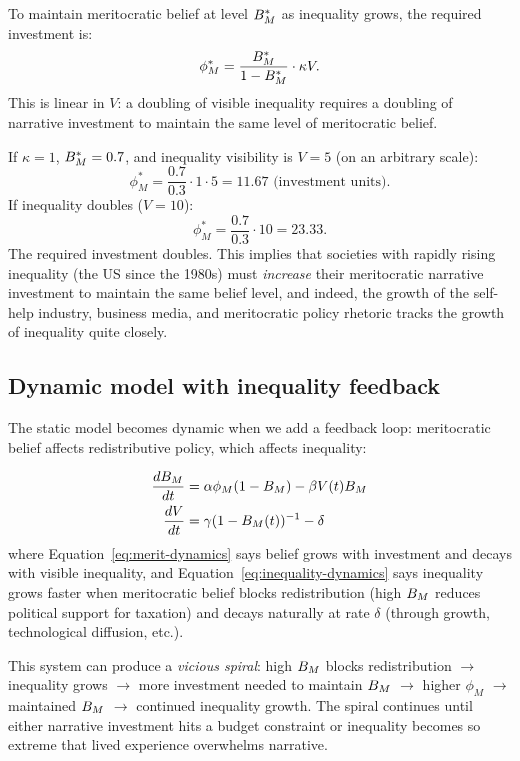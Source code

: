 \begin{proposition}
\label{prop:legitimation-cost}
To maintain meritocratic belief at level $B_{M}^*$ as inequality grows, the required investment is:
\[
  \phi_M^* = \frac{B_{M}^*}{1 - B_{M}^*} \cdot \kappa V.
\]
This is linear in $V$: a doubling of visible inequality requires a doubling of narrative investment to maintain the same level of meritocratic belief.
\end{proposition}

\begin{example}
\label{ex:legitimation-cost}
If $\kappa = 1$, $B_{M}^* = 0.7$, and inequality visibility is $V = 5$ (on an arbitrary scale):
\[
  \phi_M^* = \frac{0.7}{0.3} \cdot 1 \cdot 5 = 11.67 \text{ (investment units)}.
\]
If inequality doubles ($V = 10$):
\[
  \phi_M^* = \frac{0.7}{0.3} \cdot 10 = 23.33.
\]
The required investment doubles.
This implies that societies with rapidly rising inequality (the US since the 1980s) must \emph{increase} their meritocratic narrative investment to maintain the same belief level, and indeed, the growth of the self-help industry, business media, and meritocratic policy rhetoric tracks the growth of inequality quite closely.
\end{example}

\subsection{Dynamic model with inequality feedback}

The static model becomes dynamic when we add a feedback loop: meritocratic belief affects redistributive policy, which affects inequality:

\begin{model}
\label{mod:merit-inequality-feedback}
\begin{align}
  \frac{dB_{M}}{dt} &= \alpha \phi_M (1 - B_{M}) - \beta V(t) B_{M} \label{eq:merit-dynamics} \\
  \frac{dV}{dt} &= \gamma (1 - B_{M}(t))^{-1} - \delta \label{eq:inequality-dynamics}
\end{align}
where Equation~\eqref{eq:merit-dynamics} says belief grows with investment and decays with visible inequality, and Equation~\eqref{eq:inequality-dynamics} says inequality grows faster when meritocratic belief blocks redistribution (high $B_{M}$ reduces political support for taxation) and decays naturally at rate $\delta$ (through growth, technological diffusion, etc.).

This system can produce a \emph{vicious spiral}: high $B_{M}$ blocks redistribution $\to$ inequality grows $\to$ more investment needed to maintain $B_{M}$ $\to$ higher $\phi_M$ $\to$ maintained $B_{M}$ $\to$ continued inequality growth.
The spiral continues until either narrative investment hits a budget constraint or inequality becomes so extreme that lived experience overwhelms narrative.
\end{model}

